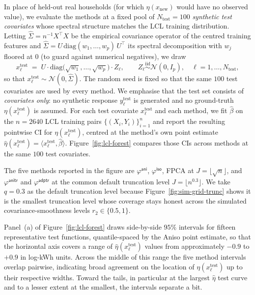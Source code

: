 \documentclass[aos]{imsart}
\renewcommand{\hat}{\widehat}
\newcommand{\iso}{\mathsf{iso}}
\newcommand{\ani}{\mathsf{ani}}
\newcommand{\anitr}{\mathsf{anitr}}
\newcommand{\adptr}{\mathsf{adptr}}
\theoremstyle{plain}
\theoremstyle{definition}
\theoremstyle{definition}
\begin{document}
In place of held-out real households (for which $\eta(x_{\text{new}})$ would have no observed value), we evaluate the methods at a fixed pool of $N_{\text{test}} = 100$ \emph{synthetic test covariates} whose spectral structure matches the LCL training distribution. Letting $\hat\Sigma = n^{-1} X^\top X$ be the empirical covariance operator of the centred training features and $\hat\Sigma = U\,\mathrm{diag}(w_1, \ldots, w_p)\,U^\top$ its spectral decomposition with $w_j$ floored at $0$ (to guard against numerical negatives), we draw
\[
x_\ell^{\text{test}} \;=\; U \cdot \mathrm{diag}\!\big(\sqrt{w_1}, \ldots, \sqrt{w_p}\big) \cdot Z_\ell,
\qquad Z_\ell \overset{\text{iid}}{\sim} \mathcal N(0, I_p),
\quad \ell = 1, \ldots, N_{\text{test}},
\]
so that $x_\ell^{\text{test}} \sim \mathcal N(0, \hat\Sigma)$. The random seed is fixed so that the same $100$ test covariates are used by every method. We emphasise that the test set consists of \emph{covariates only}: no synthetic response $y_\ell^{\text{test}}$ is generated and no ground-truth $\eta(x_\ell^{\text{test}})$ is assumed. For each test covariate $x_\ell^{\text{test}}$ and each method, we fit $\hat\beta$ on the $n=2640$ LCL training pairs $\{(X_i, Y_i)\}_{i=1}^n$ and report the resulting pointwise CI for $\eta(x_\ell^{\text{test}})$, centred at the method's own point estimate $\hat\eta(x_\ell^{\text{test}}) = \langle x_\ell^{\text{test}}, \hat\beta\rangle$. Figure~\ref{fig:lcl-forest} compares those CIs across methods at the same $100$ test covariates.

The five methods reported in the figure are $\varphi^{\ani}$, $\varphi^{\iso}$, FPCA at $J=\lfloor\sqrt n\rfloor$, and $\varphi^{\anitr}$ and $\varphi^{\adptr}$ at the common default truncation level $J=\lfloor n^{0.3}\rfloor$. We take $q=0.3$ as the default truncation level because Figure~\ref{fig:sim-grid-trunc} shows it is the smallest truncation level whose coverage stays honest across the simulated covariance-smoothness levels $r_2\in\{0.5,1\}.$

Panel~(a) of Figure~\ref{fig:lcl-forest} draws side-by-side $95\%$ intervals for fifteen representative test functions, quantile-spaced by the Aniso point estimate, so that the horizontal axis covers a range of $\hat\eta(x_\ell^{\text{test}})$ values from approximately $-0.9$ to $+0.9$ in log-kWh units. Across the middle of this range the five method intervals overlap pairwise, indicating broad agreement on the location of $\eta(x_\ell^{\text{test}})$ up to their respective widths. Toward the tails, in particular at the largest $\hat\eta$ test curve and to a lesser extent at the smallest, the intervals separate a bit.
\end{document}
